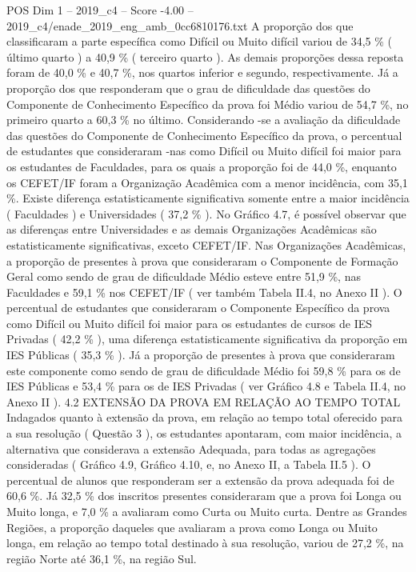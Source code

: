 \begin{textsample}{POS Dim 1 – 2019\_c4 – Score -4.00 – 2019\_c4/enade\_2019\_eng\_amb\_0cc6810176.txt}
A proporção dos que classificaram a parte específica como Difícil ou Muito difícil variou de 34,5 \% ( último quarto ) a 40,9 \% ( terceiro quarto ).
As demais proporções dessa reposta foram de 40,0 \% e 40,7 \%, nos quartos inferior e segundo, respectivamente.
Já a proporção dos que responderam que o grau de dificuldade das questões do Componente de Conhecimento Específico da prova foi Médio variou de 54,7 \%, no primeiro quarto a 60,3 \% no último.
Considerando -se a avaliação da dificuldade das questões do Componente de Conhecimento Específico da prova, o percentual de estudantes que consideraram -nas como Difícil ou Muito difícil foi maior para os estudantes de Faculdades, para os quais a proporção foi de 44,0 \%, enquanto os CEFET/IF foram a Organização Acadêmica com a menor incidência, com 35,1 \%.
Existe diferença estatisticamente significativa somente entre a maior incidência ( Faculdades ) e Universidades ( 37,2 \% ).
No Gráfico 4.7, é possível observar que as diferenças entre Universidades e as demais Organizações Acadêmicas são estatisticamente significativas, exceto CEFET/IF.
Nas Organizações Acadêmicas, a proporção de presentes à prova que consideraram o Componente de Formação Geral como sendo de grau de dificuldade Médio esteve entre 51,9 \%, nas Faculdades e 59,1 \% nos CEFET/IF ( ver também Tabela II.4, no Anexo II ).
O percentual de estudantes que consideraram o Componente Específico da prova como Difícil ou Muito difícil foi maior para os estudantes de cursos de IES Privadas ( 42,2 \% ), uma diferença estatisticamente significativa da proporção em IES Públicas ( 35,3 \% ).
Já a proporção de presentes à prova que consideraram este componente como sendo de grau de dificuldade Médio foi 59,8 \% para os de IES Públicas e 53,4 \% para os de IES Privadas ( ver Gráfico 4.8 e Tabela II.4, no Anexo II ). 4.2 EXTENSÃO DA PROVA EM RELAÇÃO AO TEMPO TOTAL Indagados quanto à extensão da prova, em relação ao tempo total oferecido para a sua resolução ( Questão 3 ), os estudantes apontaram, com maior incidência, a alternativa que considerava a extensão Adequada, para todas as agregações consideradas ( Gráfico 4.9, Gráfico 4.10, e, no Anexo II, a Tabela II.5 ).
O percentual de alunos que responderam ser a extensão da prova adequada foi de 60,6 \%.
Já 32,5 \% dos inscritos presentes consideraram que a prova foi Longa ou Muito longa, e 7,0 \% a avaliaram como Curta ou Muito curta.
Dentre as Grandes Regiões, a proporção daqueles que avaliaram a prova como Longa ou Muito longa, em relação ao tempo total destinado à sua resolução, variou de 27,2 \%, na região Norte até 36,1 \%, na região Sul.

\end{textsample}
